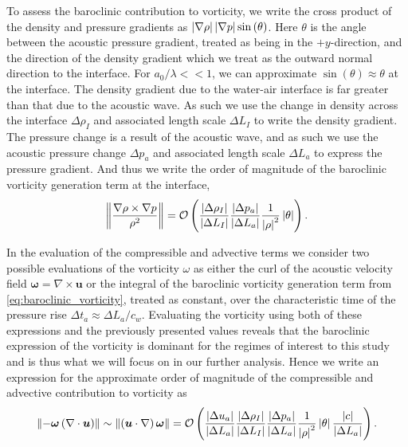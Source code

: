 To assess the baroclinic contribution to vorticity, we write the cross
product of the density and pressure gradients as
$\left|\nabla \rho\right| \left|\nabla p\right| \sin{\left(\theta\right)}$. Here
$\theta$ is the angle between the acoustic pressure gradient, treated
as being in the $\plus y$-direction, and the direction of the density
gradient which we treat as the outward normal direction to the
interface. For $a_0/\lambda<<1$, we can approximate
$\sin{\left(\theta\right)}\approx\theta$ at the interface. The density
gradient due to the water-air interface is far greater than that due
to the acoustic wave. As such we use the change in density across the
interface $\Delta \rho_I$ and associated length scale $\Delta L_I$ to
write the density gradient. The pressure change is a result of the
acoustic wave, and as such we use the acoustic pressure change
$\Delta p_a$ and associated length scale $\Delta L_a$ to express the
pressure gradient. And thus we write the order of magnitude of the
baroclinic vorticity generation term at the interface,
\begin{align}
  \label{eq:baroclinic_vorticity}%
  \norm{\frac{\nabla\rho\times\nabla p}{\rho^2}} = \orderof{\frac{\abs{\Delta \rho_I}}{\abs{\Delta L_I}}\frac{\abs{\Delta p_a}}{\abs{\Delta L_a}}\frac{1}{\abs{\rho}^2}\abs{\theta}}.%
\end{align}

In the evaluation of the compressible and advective terms we consider
two possible evaluations of the vorticity $\omega$ as either the curl
of the acoustic velocity field $\boldsymbol{\omega}=\nabla\times\boldsymbol{u}$ or
the integral of the baroclinic vorticity generation term from
\eqref{eq:baroclinic_vorticity}, treated as constant, over the
characteristic time of the pressure rise
$\Delta t_a\approx\Delta L_a/c_w$. Evaluating the vorticity using both
of these expressions and the previously presented values reveals that
the baroclinic expression of the vorticity is dominant for
the regimes of interest to this study and is thus what we will focus
on in our further analysis. Hence we write an expression for the
approximate order of magnitude of the compressible and advective
contribution to vorticity as
\begin{align}
  \label{eq:compressible_advective_vorticity}%
\norm{-\boldsymbol{\omega}\left(\nabla\cdot\boldsymbol{u}\right)}\sim \norm{\left(\boldsymbol{u}\cdot\nabla\right)\boldsymbol{\omega}} = %
\orderof{\frac{\abs{\Delta u_a}}{\abs{\Delta L_a}} \frac{\abs{\Delta \rho_I}}{\abs{\Delta L_I}}\frac{\abs{\Delta p_a}}{\abs{\Delta L_a}}\frac{1}{\abs{\rho}^2}\abs{\theta}\frac{\abs{c}}{\abs{\Delta L_a}}}.%
\end{align}

